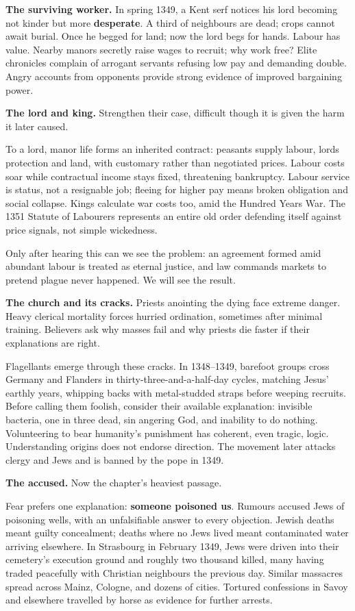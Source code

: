 \textbf{The surviving worker.} In spring 1349, a Kent serf notices his lord becoming not kinder but more \textbf{desperate}. A third of neighbours are dead; crops cannot await burial. Once he begged for land; now the lord begs for hands. Labour has value. Nearby manors secretly raise wages to recruit; why work free? Elite chronicles complain of arrogant servants refusing low pay and demanding double. Angry accounts from opponents provide strong evidence of improved bargaining power.

\textbf{The lord and king.} Strengthen their case, difficult though it is given the harm it later caused.

To a lord, manor life forms an inherited contract: peasants supply labour, lords protection and land, with customary rather than negotiated prices. Labour costs soar while contractual income stays fixed, threatening bankruptcy. Labour service is status, not a resignable job; fleeing for higher pay means broken obligation and social collapse. Kings calculate war costs too, amid the Hundred Years War. The 1351 Statute of Labourers represents an entire old order defending itself against price signals, not simple wickedness.

Only after hearing this can we see the problem: an agreement formed amid abundant labour is treated as eternal justice, and law commands markets to pretend plague never happened. We will see the result.

\textbf{The church and its cracks.} Priests anointing the dying face extreme danger. Heavy clerical mortality forces hurried ordination, sometimes after minimal training. Believers ask why masses fail and why priests die faster if their explanations are right.

Flagellants emerge through these cracks. In 1348--1349, barefoot groups cross Germany and Flanders in thirty-three-and-a-half-day cycles, matching Jesus' earthly years, whipping backs with metal-studded straps before weeping recruits. Before calling them foolish, consider their available explanation: invisible bacteria, one in three dead, sin angering God, and inability to do nothing. Volunteering to bear humanity's punishment has coherent, even tragic, logic. Understanding origins does not endorse direction. The movement later attacks clergy and Jews and is banned by the pope in 1349.

\textbf{The accused.} Now the chapter's heaviest passage.

Fear prefers one explanation: \textbf{someone poisoned us}. Rumours accused Jews of poisoning wells, with an unfalsifiable answer to every objection. Jewish deaths meant guilty concealment; deaths where no Jews lived meant contaminated water arriving elsewhere. In Strasbourg in February 1349, Jews were driven into their cemetery's execution ground and roughly two thousand killed, many having traded peacefully with Christian neighbours the previous day. Similar massacres spread across Mainz, Cologne, and dozens of cities. Tortured confessions in Savoy and elsewhere travelled by horse as evidence for further arrests.

